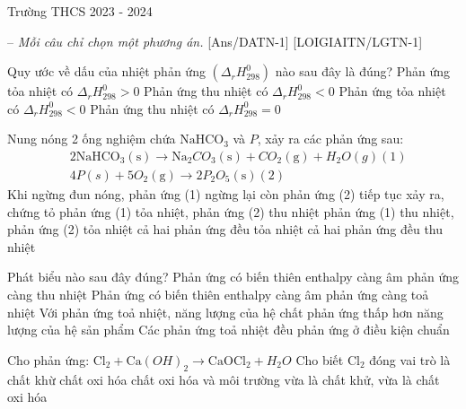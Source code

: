 \def\x{210}
\setcounter{bt}{0}
\setcounter{ex}{0}
\begin{tcolorbox}
	\begin{name}{Trường THCS }{2023 - 2024}
	\end{name}
\end{tcolorbox}
-- \textit{Mỗi câu chỉ chọn một phương án.}
[Ans/DATN-1]
\luuloigiaiex
{}[LOIGIAITN/LGTN-1]
\begin{ex}
	Quy ước về dấu của nhiệt phản ứng $\left(\Delta_r H_{298}^0\right)$ nào sau đây là đúng?
	\choice
	{Phản ứng tỏa nhiệt có $\Delta_r H_{298}^0> 0$}
	{Phản ứng thu nhiệt có $\Delta_r H_{298}^0< 0$}
	{Phản ứng tỏa nhiệt có $\Delta_r H_{298}^0< 0$}
	{Phản ứng thu nhiệt có $\Delta_r H_{298}^0=0$}
	\loigiai{}
\end{ex}
\begin{ex}
	Nung nóng 2 ống nghiệm chứa $\mathrm{NaHCO}_3$ và $P$, xảy ra các phản ứng sau:
	\[
	\begin{aligned}
		& 2 \mathrm{NaHCO}_3(\mathrm{s}) \to \mathrm{Na}_2 CO_3(\mathrm{s})+CO_2(\mathrm{g})+H_2 O(g)(1) \\
		& 4 P(s)+5 O_2(\mathrm{g}) \to 2 P_2 O_5(\mathrm{s})(2)
	\end{aligned}
	\]
	Khi ngừng đun nóng, phản ứng (1) ngừng lại còn phản ứng (2) tiếp tục xảy ra, chứng tỏ
	\choice
	{phản ứng (1) tỏa nhiệt, phản ứng (2) thu nhiệt}
	{phản ứng (1) thu nhiệt, phản ứng (2) tỏa nhiệt}
	{cả hai phản ứng đều tỏa nhiệt}
	{cả hai phản ứng đều thu nhiệt}
	\loigiai{}
\end{ex}
\begin{ex}
	Phát biểu nào sau đây đúng?
	\choice
	{Phản ứng có biến thiên enthalpy càng âm phản ứng càng thu nhiệt}
	{Phản ứng có biến thiên enthalpy càng âm phản ứng càng toả nhiệt}
	{Với phản ứng toả nhiệt, năng lượng của hệ chất phản ứng thấp hơn năng lượng của hệ sản phẩm}
	{Các phản ứng toả nhiệt đều phản ứng ở điều kiện chuẩn}
	\loigiai{}
\end{ex}
\begin{ex}
	Cho phản ứng: $\mathrm{Cl}_2+\mathrm{Ca}(OH)_2 \to \mathrm{CaOCl}_2+H_2O$
	Cho biết $\mathrm{Cl}_2$ đóng vai trò là
	\choice
	{chất khừ}
	{chất oxi hóa}
	{chất oxi hóa và môi trường}
	{vừa là chất khử, vừa là chất oxi hóa}
	\loigiai{}
\end{ex}
